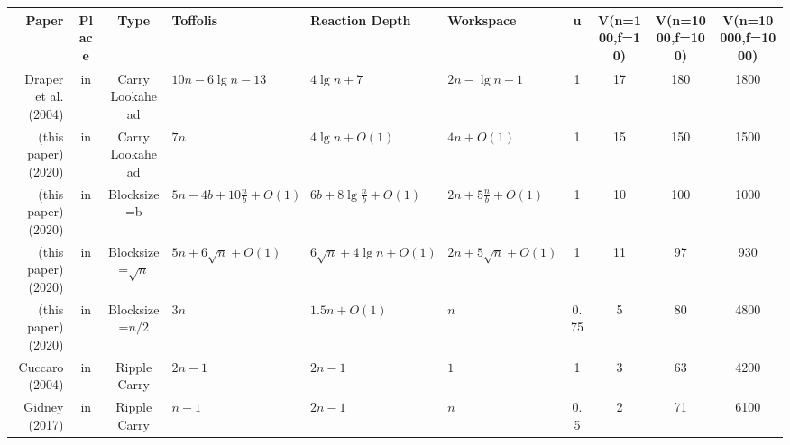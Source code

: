 \begin{tabular}{r|c|c|l|l|l|c|c|c|c}
Paper                                                &Place &Type                   &Toffolis                         &Reaction Depth                 &Workspace                  &u    &V(n=100,f=10) &V(n=1000,f=100) &V(n=10000,f=1000) \\
\hline
Draper et al. (2004) \cite{draper2004lookaheadadder} &in    &Carry Lookahead        &$10n - 6\lg n - 13$              &$4\lg n + 7$                   &$2n - \lg n - 1$           &1    &17            &180             &1800              \\
(this paper) (2020)                                  &in    &Carry Lookahead        &$7n$                             &$4\lg n + O(1)$                &$4n + O(1)$                &1    &15            &150             &1500              \\
(this paper) (2020)                                  &in    &Blocksize=b            &$5n - 4b + 10\frac{n}{b} + O(1)$ &$6b + 8\lg \frac{n}{b} + O(1)$ &$2n + 5\frac{n}{b} + O(1)$ &1    &10            &100             &1000              \\
(this paper) (2020)                                  &in    &Blocksize=$\sqrt{n}$   &$5n + 6\sqrt n + O(1)$           &$6\sqrt n + 4\lg n + O(1)$     &$2n + 5\sqrt n + O(1)$     &1    &11            &97              &930               \\
(this paper) (2020)                                  &in    &Blocksize=$n/2$        &$3n$                             &$1.5n + O(1)$                  &$n$                        &0.75 &5             &80              &4800              \\
Cuccaro (2004) \cite{cuccaro2004adder}               &in    &Ripple Carry           &$2n - 1$                         &$2n - 1$                       &$1$                        &1    &3             &63              &4200              \\
Gidney (2017) \cite{gidney2018halving}               &in    &Ripple Carry           &$n - 1$                          &$2n - 1$                       &$n$                        &0.5  &2             &71              &6100              \\


\end{tabular}
